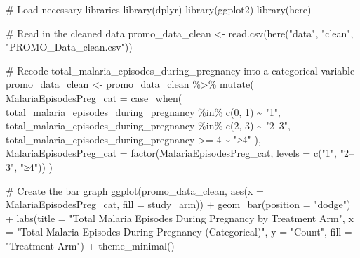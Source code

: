 \documentclass[
  letterpaper,
  DIV=11,
  numbers=noendperiod]{scrartcl}
\newenvironment{Shaded}{}{}
\newcommand{\AttributeTok}[1]{\textcolor[rgb]{0.84,0.23,0.29}{#1}}
\newcommand{\CommentTok}[1]{\textcolor[rgb]{0.42,0.45,0.49}{#1}}
\newcommand{\DecValTok}[1]{\textcolor[rgb]{0.00,0.36,0.77}{#1}}
\newcommand{\FunctionTok}[1]{\textcolor[rgb]{0.44,0.26,0.76}{#1}}
\newcommand{\NormalTok}[1]{\textcolor[rgb]{0.14,0.16,0.18}{#1}}
\newcommand{\OtherTok}[1]{\textcolor[rgb]{0.44,0.26,0.76}{#1}}
\newcommand{\SpecialCharTok}[1]{\textcolor[rgb]{0.00,0.36,0.77}{#1}}
\newcommand{\StringTok}[1]{\textcolor[rgb]{0.01,0.18,0.38}{#1}}
\begin{document}
\begin{Shaded}
\begin{Highlighting}[]
\CommentTok{\# Load necessary libraries}
\FunctionTok{library}\NormalTok{(dplyr)}
\FunctionTok{library}\NormalTok{(ggplot2)}
\FunctionTok{library}\NormalTok{(here)}

\CommentTok{\# Read in the cleaned data}
\NormalTok{promo\_data\_clean }\OtherTok{\textless{}{-}} \FunctionTok{read.csv}\NormalTok{(}\FunctionTok{here}\NormalTok{(}\StringTok{"data"}\NormalTok{, }\StringTok{"clean"}\NormalTok{, }\StringTok{"PROMO\_Data\_clean.csv"}\NormalTok{))}

\CommentTok{\# Recode \textquotesingle{}total\_malaria\_episodes\_during\_pregnancy\textquotesingle{} into a categorical variable}
\NormalTok{promo\_data\_clean }\OtherTok{\textless{}{-}}\NormalTok{ promo\_data\_clean }\SpecialCharTok{\%\textgreater{}\%}
  \FunctionTok{mutate}\NormalTok{(}
    \AttributeTok{MalariaEpisodesPreg\_cat =} \FunctionTok{case\_when}\NormalTok{(}
\NormalTok{      total\_malaria\_episodes\_during\_pregnancy }\SpecialCharTok{\%in\%} \FunctionTok{c}\NormalTok{(}\DecValTok{0}\NormalTok{, }\DecValTok{1}\NormalTok{) }\SpecialCharTok{\textasciitilde{}} \StringTok{"1"}\NormalTok{,}
\NormalTok{      total\_malaria\_episodes\_during\_pregnancy }\SpecialCharTok{\%in\%} \FunctionTok{c}\NormalTok{(}\DecValTok{2}\NormalTok{, }\DecValTok{3}\NormalTok{) }\SpecialCharTok{\textasciitilde{}} \StringTok{"2–3"}\NormalTok{,}
\NormalTok{      total\_malaria\_episodes\_during\_pregnancy }\SpecialCharTok{\textgreater{}=} \DecValTok{4} \SpecialCharTok{\textasciitilde{}} \StringTok{"≥4"}
\NormalTok{    ),}
    \AttributeTok{MalariaEpisodesPreg\_cat =} \FunctionTok{factor}\NormalTok{(MalariaEpisodesPreg\_cat, }\AttributeTok{levels =} \FunctionTok{c}\NormalTok{(}\StringTok{"1"}\NormalTok{, }\StringTok{"2–3"}\NormalTok{, }\StringTok{"≥4"}\NormalTok{))}
\NormalTok{  )}

\CommentTok{\# Create the bar graph}
\FunctionTok{ggplot}\NormalTok{(promo\_data\_clean, }\FunctionTok{aes}\NormalTok{(}\AttributeTok{x =}\NormalTok{ MalariaEpisodesPreg\_cat, }\AttributeTok{fill =}\NormalTok{ study\_arm)) }\SpecialCharTok{+}
  \FunctionTok{geom\_bar}\NormalTok{(}\AttributeTok{position =} \StringTok{"dodge"}\NormalTok{) }\SpecialCharTok{+}
  \FunctionTok{labs}\NormalTok{(}\AttributeTok{title =} \StringTok{"Total Malaria Episodes During Pregnancy by Treatment Arm"}\NormalTok{,}
       \AttributeTok{x =} \StringTok{"Total Malaria Episodes During Pregnancy (Categorical)"}\NormalTok{,}
       \AttributeTok{y =} \StringTok{"Count"}\NormalTok{,}
       \AttributeTok{fill =} \StringTok{"Treatment Arm"}\NormalTok{) }\SpecialCharTok{+}
  \FunctionTok{theme\_minimal}\NormalTok{()}
\end{Highlighting}
\end{Shaded}
\end{document}
